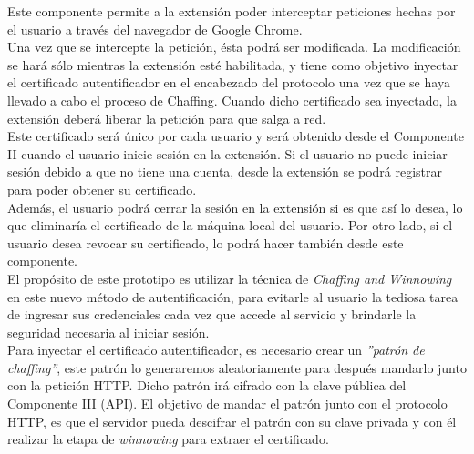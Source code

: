 \documentclass[12pt, a4paper, titlepage]{report}
\begin{document}
		    Este componente permite a la extensión poder interceptar peticiones hechas por el usuario a través del navegador de Google Chrome.\\
		    Una vez que se intercepte la petición, ésta podrá ser modificada. La modificación se hará sólo mientras la extensión esté habilitada, y tiene como objetivo inyectar el certificado autentificador en el encabezado del protocolo una vez que se haya llevado a cabo el proceso de Chaffing. Cuando dicho certificado sea inyectado, la extensión deberá liberar la petición para que salga a red.\\
		    Este certificado será único por cada usuario y será obtenido desde el Componente II cuando el usuario inicie sesión en la extensión. Si el usuario no puede iniciar sesión debido a que no tiene una cuenta, desde la extensión se podrá registrar para poder obtener su certificado.\\
		    Además, el usuario podrá cerrar la sesión en la extensión si es que así lo desea, lo que eliminaría el certificado de la máquina local del usuario. Por otro lado, si el usuario desea revocar su certificado, lo podrá hacer también desde este componente.\\
		    
		    El propósito de este prototipo es utilizar la técnica de \textit{Chaffing and Winnowing} en este nuevo método de autentificación, para evitarle al usuario la tediosa tarea de ingresar sus credenciales cada vez que accede al servicio y brindarle la seguridad necesaria al iniciar sesión.\\
		    
		    Para inyectar el certificado autentificador, es necesario crear un \textit{''patrón de chaffing''}, este patrón lo generaremos aleatoriamente para después mandarlo junto con la petición HTTP.
		    Dicho patrón irá cifrado con la clave pública del Componente III (API). El objetivo de mandar el patrón junto con el protocolo HTTP, es que el servidor pueda descifrar el patrón con su clave privada y con él realizar la etapa de \textit{winnowing} para extraer el certificado.\\
            
\end{document}
